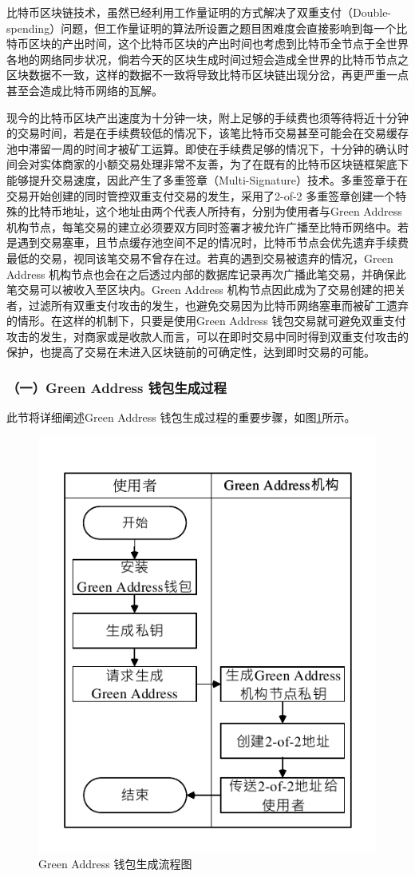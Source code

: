 			 	比特币区块链技术，虽然已经利用工作量证明的方式解决了双重支付（Double-spending）问题\supercite{Informationpropagationinthebitcoinnetwork}\supercite{Double-spendingfastpaymentsinbitcoin}，但工作量证明的算法所设置之题目困难度会直接影响到每一个比特币区块的产出时间，这个比特币区块的产出时间也考虑到比特币全节点于全世界各地的网络同步状况，倘若今天的区块生成时间过短会造成全世界的比特币节点之区块数据不一致，这样的数据不一致将导致比特币区块链出现分岔，再更严重一点甚至会造成比特币网络的瓦解。

			 	现今的⽐特币区块产出速度为⼗分钟⼀块，附上⾜够的⼿续费也须等待将近⼗分钟的交易时间，若是在⼿续费较低的情况下，该笔⽐特币交易甚⾄可能会在交易缓存池中滞留⼀周的时间才被矿工运算。即使在⼿续费⾜够的情况下，⼗分钟的确认时间会对实体商家的⼩额交易处理⾮常不友善，为了在既有的⽐特币区块链框架底下能够提升交易速度，因此产生了多重签章（Multi-Signature）技术。多重签章于在交易开始创建的同时管控双重⽀付交易的发⽣，采⽤了2-of-2 多重签章创建⼀个特殊的⽐特币地址，这个地址由两个代表⼈所持有，分别为使⽤者与Green Address\supercite{GreenAddress}机构节点，每笔交易的建⽴必须要双⽅同时签署才被允许广播⾄⽐特币网络中。若是遇到交易塞⾞，且节点缓存池空间不⾜的情况时，⽐特币节点会优先遗弃⼿续费最低的交易，视同该笔交易不曾存在过。若真的遇到交易被遗弃的情况，Green Address 机构节点也会在之后透过内部的数据库记录再次广播此笔交易，并确保此笔交易可以被收⼊⾄区块内。Green Address 机构节点因此成为了交易创建的把关者，过滤所有双重⽀付攻击的发⽣，也避免交易因为⽐特币网络塞⾞⽽被矿⼯遗弃的情形。在这样的机制下，只要是使⽤Green Address 钱包交易就可避免双重⽀付攻击的发⽣，对商家或是收款⼈⽽⾔，可以在即时交易中同时得到双重⽀付攻击的保护，也提高了交易在未进⼊区块链前的可确定性，达到即时交易的可能。

			 	\subsubsection{（一）Green Address 钱包生成过程}
			 	此节将详细阐述Green Address 钱包生成过程的重要步骤，如图\ref{gabuild}所示。
			 	\begin{figure}[!htbp]
					\centering
					\includegraphics[width = .4\textwidth]{gabuild.pdf}
					\caption{Green Address 钱包生成流程图}\label{gabuild}
				\end{figure}

